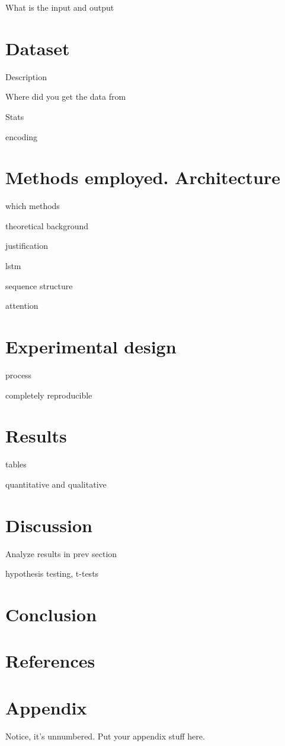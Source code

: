 \documentclass[a4paper,]{report}
\begin{document}
What is the input and output

\chapter{Dataset}\label{sec:dataset}

Description

Where did you get the data from

Stats

encoding

\chapter{Methods employed.
Architecture}\label{sec:methods-employed.-architecture}

which methods

theoretical background

justification

lstm

sequence structure

attention

\chapter{Experimental design}\label{sec:experimental-design}

process

completely reproducible

\chapter{Results}\label{sec:results}

tables

quantitative and qualitative

\chapter{Discussion}\label{sec:discussion}

Analyze results in prev section

hypothesis testing, t-tests

\chapter{Conclusion}\label{sec:conclusion}

\chapter*{References}\label{sec:references}

\hypertarget{refs}{}

\chapter*{Appendix}\label{sec:appendix}

Notice, it's unnumbered. Put your appendix stuff here.
\end{document}
